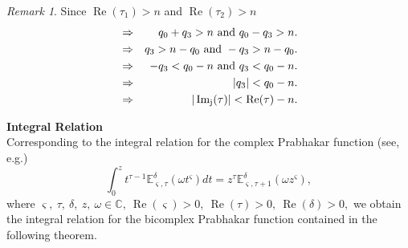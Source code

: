 \documentclass[a4paper,12pt]{article}
\theoremstyle{remark}
\newtheorem{remark}[theorem]{Remark}
\begin{document}
\begin{remark}
   Since  $\operatorname{Re}(\tau_1)>n$ and  $\operatorname{Re}(\tau_2)  >n$
	\begin{eqnarray}\notag
	&\Rightarrow & q_0+q_3 >n ~\text{and}~ q_0-q_3 >n.\notag\\
	&\Rightarrow & q_3 >n-q_0 ~\text{and}~ -q_3 >n-q_0.\notag\\
		&\Rightarrow & -q_3 <q_0-n ~\text{and}~ q_3 <q_0-n.\notag\\
	&	\Rightarrow& ~ |q_3|<q_0-n.\label{eq:re(alpha)g}\notag\\
	&\Rightarrow&|\operatorname{Im_j}(\tau)|<\operatorname{Re}(\tau)-n.
	\end{eqnarray}
	
\end{remark}	

\noindent\textbf{Integral Relation}\\
Corresponding to the integral relation for the complex Prabhakar  function (see, e.g.\cite[p.100]{gorenflo2014})
\begin{equation}\label{eq:p int}
\int_{0}^{z}t^{\tau-1}\mathbb{E}^\delta_{ \varsigma,\tau}(\omega t^ \varsigma)dt=z^{\tau}\mathbb{E}^\delta_{ \varsigma,\tau+1}(\omega z^ \varsigma),
\end{equation}
where $ \varsigma,~\tau,~\delta,~z,~\omega\in\mathbb{C},~\operatorname{Re}( \varsigma)>0,~\operatorname{Re}(\tau)>0,~\operatorname{Re}(\delta)>0,$ we obtain the integral relation for the bicomplex Prabhakar function contained in the following theorem.\\
\end{document}
